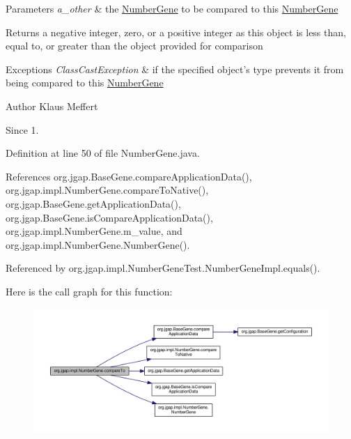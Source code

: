 \begin{DoxyParams}{Parameters}
{\em a\-\_\-other} & the \hyperlink{classorg_1_1jgap_1_1impl_1_1_number_gene}{Number\-Gene} to be compared to this \hyperlink{classorg_1_1jgap_1_1impl_1_1_number_gene}{Number\-Gene} \\
\hline
\end{DoxyParams}
\begin{DoxyReturn}{Returns}
a negative integer, zero, or a positive integer as this object is less than, equal to, or greater than the object provided for comparison
\end{DoxyReturn}

\begin{DoxyExceptions}{Exceptions}
{\em Class\-Cast\-Exception} & if the specified object's type prevents it from being compared to this \hyperlink{classorg_1_1jgap_1_1impl_1_1_number_gene}{Number\-Gene}\\
\hline
\end{DoxyExceptions}
\begin{DoxyAuthor}{Author}
Klaus Meffert 
\end{DoxyAuthor}
\begin{DoxySince}{Since}
1. 
\end{DoxySince}


Definition at line 50 of file Number\-Gene.\-java.



References org.\-jgap.\-Base\-Gene.\-compare\-Application\-Data(), org.\-jgap.\-impl.\-Number\-Gene.\-compare\-To\-Native(), org.\-jgap.\-Base\-Gene.\-get\-Application\-Data(), org.\-jgap.\-Base\-Gene.\-is\-Compare\-Application\-Data(), org.\-jgap.\-impl.\-Number\-Gene.\-m\-\_\-value, and org.\-jgap.\-impl.\-Number\-Gene.\-Number\-Gene().



Referenced by org.\-jgap.\-impl.\-Number\-Gene\-Test.\-Number\-Gene\-Impl.\-equals().



Here is the call graph for this function\-:
\nopagebreak
\begin{figure}[H]
\begin{center}
\leavevmode
\includegraphics[width=350pt]{classorg_1_1jgap_1_1impl_1_1_number_gene_a3d3b44370a460ad1467f4dd0520a2f95_cgraph}
\end{center}
\end{figure}


